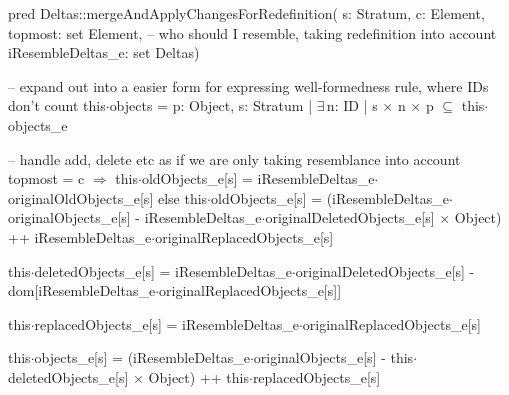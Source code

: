 pred Deltas::mergeAndApplyChangesForRedefinition(
  s: Stratum,
  c: Element,
  topmost: set Element,
  -- who should I resemble, taking redefinition into account
  iResembleDeltas_e: set Deltas)
{
  -- expand out into a easier form for expressing well-formedness rule, where IDs don't count
  this$\cdot$objects = {p: Object, s: Stratum |
    $\exists\,$n: ID | s$\,\times\,$n$\,\times\,$p $\subseteq$ this$\cdot$objects_e}

  -- handle add, delete etc as if we are only taking resemblance into account
  topmost = c $\Longrightarrow$
    this$\cdot$oldObjects_e[s] = iResembleDeltas_e$\cdot$originalOldObjects_e[s]
  else
    this$\cdot$oldObjects_e[s] =
      (iResembleDeltas_e$\cdot$originalObjects_e[s]
        - iResembleDeltas_e$\cdot$originalDeletedObjects_e[s]$\,\times\,$Object)
          ++ iResembleDeltas_e$\cdot$originalReplacedObjects_e[s]

  this$\cdot$deletedObjects_e[s] =
    iResembleDeltas_e$\cdot$originalDeletedObjects_e[s]
      - dom[iResembleDeltas_e$\cdot$originalReplacedObjects_e[s]]
    
  this$\cdot$replacedObjects_e[s] = iResembleDeltas_e$\cdot$originalReplacedObjects_e[s]
      
  this$\cdot$objects_e[s] = 
    (iResembleDeltas_e$\cdot$originalObjects_e[s] - this$\cdot$deletedObjects_e[s]$\,\times\,$Object)
      ++ this$\cdot$replacedObjects_e[s]
}

